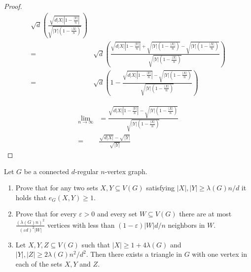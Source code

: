 \documentclass[a4paper, 11pt, oneside]{article}
\newenvironment{problem}[1]
  {\renewcommand\theinnercustomprob{#1}\innercustomprob}
  {\endinnercustomprob}
\newcommand\abs[1]{\left|#1\right|}
\begin{document}
\begin{proof}
\begin{align*}
\sqrt{d}\left(\frac{\sqrt{ d \abs{X} \left\lvert  1 - \frac{\abs{Y}}{n} \right\rvert}}{\sqrt{\abs{Y} \left( 1 - \frac{\abs{X}}{n} \right)} }\right) \\ = & 
\sqrt{d}\left(\frac{\sqrt{ d \abs{X} \left\lvert  1 - \frac{\abs{Y}}{n} \right\rvert } + \sqrt{\abs{Y} \left( 1 - \frac{\abs{X}}{n} \right)} - \sqrt{\abs{Y} \left( 1 - \frac{\abs{X}}{n} \right)} }{\sqrt{\abs{Y} \left( 1 - \frac{\abs{X}}{n} \right)} }\right) \\ = & 
\sqrt{d}\left(1 - \frac{\sqrt{ d \abs{X} \left\lvert  1 - \frac{\abs{Y}}{n} \right\rvert } - \sqrt{\abs{Y} \left( 1 - \frac{\abs{X}}{n} \right)} }{\sqrt{\abs{Y} \left( 1 - \frac{\abs{X}}{n} \right)} }\right)
\end{align*}

\begin{align*}
\lim_{n\to\infty} &= \frac{\sqrt{ d \abs{X} \left\lvert  1 - \frac{\abs{Y}}{n} \right\rvert } - \sqrt{\abs{Y} \left( 1 - \frac{\abs{X}}{n} \right)} }{\sqrt{\abs{Y} \left( 1 - \frac{\abs{X}}{n} \right)} }  \\=&
\frac{\sqrt{ d \abs{X}} - \sqrt{\abs{Y} } }{\sqrt{\abs{Y}} }
\end{align*}

\end{proof}		

 \begin{problem}{7}\label{problem7}
 Let $G$ be a connected $d$-regular $n$-vertex graph.
 \begin{enumerate}
 \item Prove that for any two sets $X,Y \subseteq V(G)$ satisfying $\abs{X},\abs{Y} \geq \lambda(G)n/d$ it holds that $e_G(X,Y)\geq 1$.
 \item Prove that for every $\varepsilon > 0$ and every set $W \subseteq V(G)$ there are at most $\frac{(\lambda(G)n)^2}{(\varepsilon d)^2\abs{W}}$ vertices with less than $(1 - \varepsilon)\abs{W}d/n$ neighbors in $W$.
 \item Let $X,Y,Z \subseteq V(G)$ such that $\abs{X} \geq 1 + 4\lambda(G)$ and $\abs{Y},\abs{Z} \geq 2\lambda(G)n^2/d^2$. Then there exists a triangle in $G$ with one vertex in each of the sets $X,Y$ and $Z$. 
 \end{enumerate}
 
\end{problem}

\hfill\break
\end{document}
